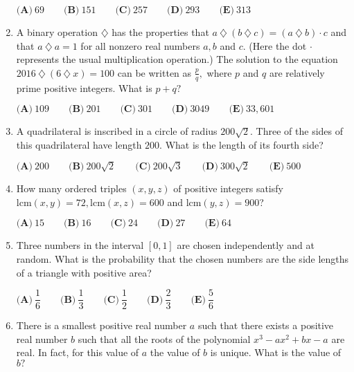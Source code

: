 \documentclass{article}
\begin{document}
\begin{enumerate}[label=\arabic*., itemsep=0.5em]
\(\textbf{(A)}\ 69\qquad\textbf{(B)}\ 151\qquad\textbf{(C)}\ 257\qquad\textbf{(D)}\ 293\qquad\textbf{(E)}\ 313\)\par \vspace{0.5em}\item A binary operation \(\diamondsuit \) has the properties that \(a\ \diamondsuit\ (b\ \diamondsuit\ c) = (a\ \diamondsuit\ b)\cdot c\) and that \(a\ \diamondsuit\ a = 1\) for all nonzero real numbers \(a, b\) and \(c.\) (Here the dot  \(\cdot\)  represents the usual multiplication operation.) The solution to the equation \(2016\ \diamondsuit\ (6\ \diamondsuit\ x) = 100\) can be written as \(\frac{p}{q},\) where \(p\) and \(q\) are relatively prime positive integers. What is \(p + q?\) 

\(\textbf{(A)}\ 109\qquad\textbf{(B)}\ 201\qquad\textbf{(C)}\ 301\qquad\textbf{(D)}\ 3049\qquad\textbf{(E)}\ 33,601\)\par \vspace{0.5em}\item A quadrilateral is inscribed in a circle of radius \(200\sqrt{2}.\) Three of the sides of this quadrilateral have length \(200.\) What is the length of its fourth side? 

\(\textbf{(A)}\ 200\qquad\textbf{(B)}\ 200\sqrt{2} \qquad\textbf{(C)}\ 200\sqrt{3} \qquad\textbf{(D)}\ 300\sqrt{2} \qquad\textbf{(E)}\ 500\)\par \vspace{0.5em}\item How many ordered triples \((x,y,z)\) of positive integers satisfy \(\text{lcm}(x,y) = 72, \text{lcm}(x,z) = 600\) and \(\text{lcm}(y,z)=900\)?

\(\textbf{(A)}\ 15\qquad\textbf{(B)}\ 16\qquad\textbf{(C)}\ 24\qquad\textbf{(D)}\ 27\qquad\textbf{(E)}\ 64\)\par \vspace{0.5em}\item Three numbers in the interval \(\left[0,1\right]\) are chosen independently and at random. What is the probability that the chosen numbers are the side lengths of a triangle with positive area?

\(\textbf{(A)}\ \dfrac{1}{6}\qquad\textbf{(B)}\ \dfrac{1}{3}\qquad\textbf{(C)}\ \dfrac{1}{2}\qquad\textbf{(D)}\ \dfrac{2}{3}\qquad\textbf{(E)}\ \dfrac{5}{6}\)\par \vspace{0.5em}\item There is a smallest positive real number \(a\) such that there exists a positive real number \(b\) such that all the roots of the polynomial \(x^3-ax^2+bx-a\) are real. In fact, for this value of \(a\) the value of \(b\) is unique. What is the value of \(b?\)


\end{enumerate}
\end{document}
